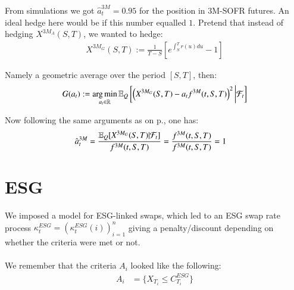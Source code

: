 \newpage 
From simulations we got $\hat{a}_{t}^{3M} = 0.95$ for the position in 3M-SOFR futures. An ideal hedge here would be if this number equalled $1$. Pretend that instead of hedging $X^{3M_{A}}(S,T)$, we wanted to hedge: 
\begin{align*}
X^{3M_{G}}(S,T) := \frac{1}{T-S}\left[
e^{\int_{S}^{T}r(u)du}-1
\right]    
\end{align*}

Namely a geometric average over the period $[S,T]$, then: 
\begin{align*}
G(a_{t}) := \operatorname*{arg\,min}\limits_{a_{t} \in \mathbb{R}}\mathbb{E}_{Q}\left[
\left(
X^{3M_{G}}(S,T)-a_{t}f^{3M}(t,S,T)
\right)^{2}
\bigg{|}\mathcal{F}_{t}
\right]
\end{align*}

Now following the same arguments as on p.\pageref{prop: optimal_hedge_arithmetic_3M_geometric}, one has:
\begin{align*}
\hat{a}_{t}^{3M} &= \frac{
\mathbb{E}_{Q}[X^{3M_{G}}(S,T)|\mathcal{F}_{t}]
}{
f^{3M}(t,S,T)
}
= 
\frac{
f^{3M}(t,S,T)
}{
f^{3M}(t,S,T)
} = 1
\end{align*}

\section{ESG}
We imposed a model for ESG-linked swaps, which led to an ESG swap rate process $\kappa_{t}^{ESG}  = (\kappa_{t}^{ESG}(i))_{i=1}^{n}$ giving a penalty/discount depending on whether the criteria were met or not.
\\~\\ 
We remember that the criteria $A_{i}$ looked like the following:
\begin{align*}
A_{i} &= \{X_{T_{i}} \leq C_{T_{i}}^{ESG}\}    
\end{align*}

